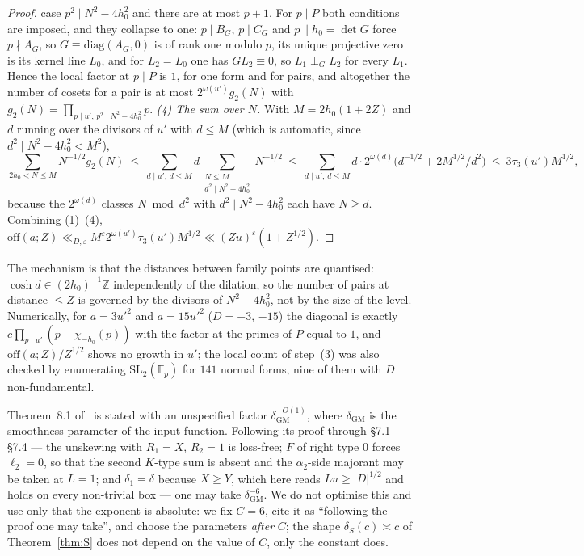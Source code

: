 \documentclass[11pt,a4paper]{article}
\newcommand{\Z}{\mathbb{Z}}\newcommand{\R}{\mathbb{R}}\newcommand{\Off}{\mathrm{Off}}\newcommand{\e}{\mathrm{e}}
\newcommand{\F}{\mathbb F}
\begin{document}
\begin{proof}
case $p^2\mid N^2-4h_0^2$ and there are at most $p+1$. For $p\mid P$ both conditions are imposed, and they collapse to one: $p\mid B_G$, $p\mid C_G$ and $p\parallel h_0=\det G$
force $p\nmid A_G$, so $G\equiv\mathrm{diag}(A_G,0)$ is of rank one modulo $p$, its unique projective zero is its kernel line $L_0$, and for $L_2=L_0$ one has $GL_2\equiv0$, so
$L_1\perp_GL_2$ for every $L_1$. Hence the local factor at $p\mid P$ is $1$, for one form and for pairs, and altogether the number of cosets for a pair is at most $2^{\omega(u')}g_2(N)$
with $g_2(N)=\prod_{p\mid u',\,p^2\mid N^2-4h_0^2}p$.
\emph{(4) The sum over $N$.} With $M=2h_0(1+2Z)$ and $d$ running over the divisors of $u'$ with $d\le M$ (which is automatic, since $d^2\mid N^2-4h_0^2<M^2$),
\[
\sum_{2h_0<N\le M}N^{-1/2}g_2(N)\ \le\ \sum_{d\mid u',\,d\le M}d\sum_{\substack{N\le M\\ d^2\mid N^2-4h_0^2}}N^{-1/2}\ \le\ \sum_{d\mid u',\,d\le M}d\cdot2^{\omega(d)}\bigl(d^{-1/2}+2M^{1/2}/d^2\bigr)\ \le\ 3\tau_3(u')M^{1/2},
\]
because the $2^{\omega(d)}$ classes $N\bmod d^2$ with $d^2\mid N^2-4h_0^2$ each have $N\ge d$. Combining (1)--(4), $\mathrm{off}(a;Z)\ll_{D,\varepsilon}M^{\varepsilon}2^{\omega(u')}\tau_3(u')M^{1/2}\ll(Zu)^{\varepsilon}(1+Z^{1/2})$.
\end{proof}
The mechanism is that the distances between family points are quantised: $\cosh d\in(2h_0)^{-1}\Z$ independently of the dilation, so the number of pairs at distance $\le Z$ is
governed by the divisors of $N^2-4h_0^2$, not by the size of the level. Numerically, for $a=3u'^2$ and $a=15u'^2$ ($D=-3$, $-15$) the diagonal is exactly
$c\prod_{p\mid u'}(p-\chi_{-h_0}(p))$ with the factor at the primes of $P$ equal to $1$, and $\mathrm{off}(a;Z)/Z^{1/2}$ shows no growth in $u'$; the local count of step~(3) was also
checked by enumerating $\mathrm{SL}_2(\F_p)$ for $141$ normal forms, nine of them with $D$ non-fundamental.

\begin{remark}\label{rem:CGM}
Theorem~8.1 of~\cite{GrimmeltMerikoski2025kernel} is stated with an unspecified factor $\delta_{\mathrm{GM}}^{-O(1)}$, where $\delta_{\mathrm{GM}}$ is the smoothness parameter of the
input function. Following its proof through \S7.1--\S7.4 --- the unskewing with $R_1=X$, $R_2=1$ is loss-free; $F$ of right type $0$ forces $\ell_2=0$, so that the second $K$-type sum
is absent and the $\alpha_2$-side majorant may be taken at $L=1$; and $\delta_1=\delta$ because $X\ge Y$, which here reads $Lu\ge|D|^{1/2}$ and holds on every non-trivial box --- one
may take $\delta_{\mathrm{GM}}^{-6}$. We do not optimise this and use only that the exponent is absolute: we fix $C=6$, cite it as ``following the proof one may take'', and choose
the parameters \emph{after} $C$; the shape $\delta_S(c)\asymp c$ of Theorem~\ref{thm:S} does not depend on the value of $C$, only the constant does.
\end{remark}
\end{document}
